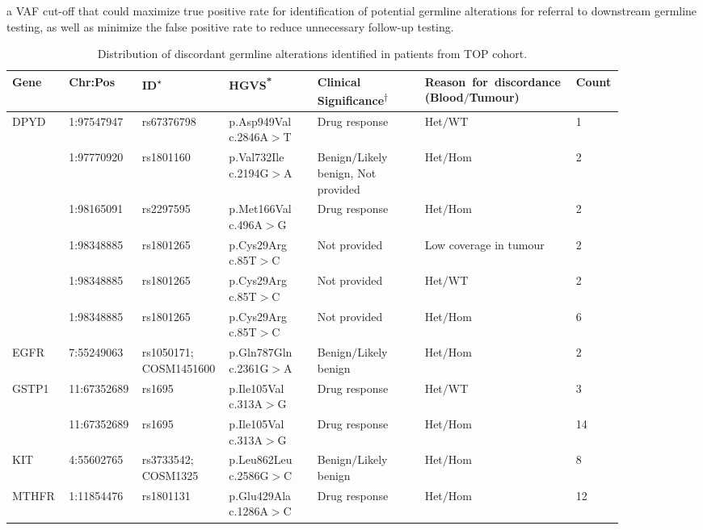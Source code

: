 a VAF cut-off that could maximize true positive rate for identification of potential germline alterations for referral to downstream germline testing, as well as minimize the false positive rate to reduce unnecessary follow-up testing.


\newpage
\begin{landscape}

\begin{longtable}{p{0.09\linewidth}|p{0.1\linewidth}p{0.12\linewidth}p{0.14\linewidth}p{0.17\linewidth}p{0.2\linewidth}p{0.06\linewidth}}
\caption{Distribution of discordant germline alterations identified in patients from TOP cohort.}
\label{tbl:freq_discordant_germline}
		\\
		\hline
		Gene & Chr:Pos & ID\textsuperscript{$\star$} & HGVS\textsuperscript{*} & Clinical Significance\textsuperscript{$\dagger$} & \hbox{Reason for discordance} (Blood$/$Tumour) & Count
		\\
		\hline
		DPYD & 1:97547947 & rs67376798 & p.Asp949Val c.2846A$>$T & Drug response & Het$/$WT & 1
		\\
		& 1:97770920 & rs1801160 & p.Val732Ile c.2194G$>$A & Benign$/$Likely benign, Not provided & Het$/$Hom & 2
		\\
		& 1:98165091 & rs2297595 & p.Met166Val c.496A$>$G & Drug response &  Het$/$Hom & 2
		\\
		& 1:98348885 & rs1801265 & p.Cys29Arg c.85T$>$C & Not provided & Low coverage in tumour & 2
		\\
		& 1:98348885 & rs1801265 & p.Cys29Arg c.85T$>$C & Not provided & Het$/$WT & 2
		\\
		& 1:98348885 & rs1801265 & p.Cys29Arg c.85T$>$C & Not provided & Het$/$Hom & 6
		\\
		\hline
		EGFR & 7:55249063 & rs1050171; COSM1451600 & p.Gln787Gln c.2361G$>$A & Benign$/$Likely benign & Het$/$Hom & 2
		\\
		\hline
		GSTP1 & 11:67352689 & rs1695 & p.Ile105Val c.313A$>$G & Drug response & Het$/$WT & 3
		\\
		& 11:67352689 & rs1695 & p.Ile105Val c.313A$>$G & Drug response & Het$/$Hom & 14
		\\
		\hline
		KIT & 4:55602765 & rs3733542; COSM1325 & p.Leu862Leu c.2586G$>$C & Benign$/$Likely benign & Het$/$Hom & 8
		\\
		\hline
		MTHFR & 1:11854476 & rs1801131 & p.Glu429Ala c.1286A$>$C & Drug response & Het$/$Hom & 12

\end{longtable}
\end{landscape}
